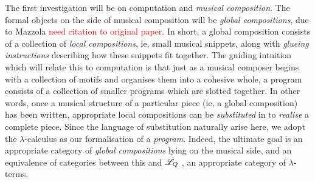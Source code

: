 The first investigation will be on computation and \emph{musical composition}. The formal objects on the side of musical composition will be \emph{global compositions}, due to Mazzola \textcolor{red}{need citation to original paper}. In short, a global composition consists of a collection of \emph{local compositions}, ie, small musical snippets, along with \emph{glueing instructions} describing how these snippets fit together. The guiding intuition which will relate this to computation is that just as a musical composer begins with a collection of motifs and organises them into a cohesive whole, a program consists of a collection of smaller programs which are slotted together. In other words, once a musical structure of a particular piece (ie, a global composition) has been written, appropriate local compositions can be \emph{substituted} in to \emph{realise} a complete piece. Since the language of substitution naturally arise here, we adopt the $\lambda$-calculus as our formalisation of a \emph{program}. Indeed, the ultimate goal is an appropriate category of \emph{global compositions} lying on the musical side, and an equivalence of categories between this and $\mathscr{L}_Q$ \cite{MurfetTroiani}, an appropriate category of $\lambda$-terms.
